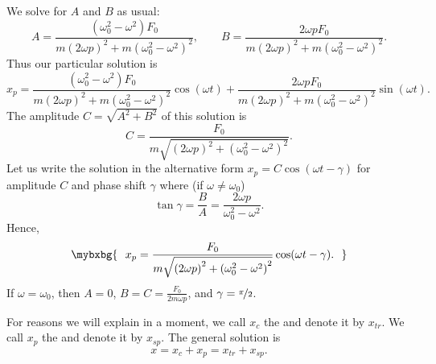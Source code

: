 We solve for $A$ and $B$ as usual:
\begin{equation*}
A=\frac{(\omega_0^2-\omega^2) F_0}
{m{(2\omega p)}^2+m{(\omega_0^2-\omega^2)}^2} ,
\qquad B=\frac{2 \omega p F_0}
{m{(2\omega p)}^2+m{(\omega_0^2-\omega^2)}^2} .
\end{equation*}
Thus our particular solution is
\begin{equation*}
x_p = 
\frac{(\omega_0^2-\omega^2) F_0}
{m{(2\omega p)}^2+m{(\omega_0^2-\omega^2)}^2} \cos (\omega t) +
\frac{2 \omega p F_0}
{m{(2\omega p)}^2+m{(\omega_0^2-\omega^2)}^2} \sin (\omega t) .
\end{equation*}
The amplitude $C = \sqrt{A^2+B^2}$ of this solution is
\begin{equation*}
C = \frac{F_0}{m \sqrt{{(2\omega p)}^2+{(\omega_0^2-\omega^2)}^2}} .
\end{equation*}
Let us write the solution
in the alternative form $x_p = C \cos(\omega t - \gamma)$
for amplitude $C$ and phase shift $\gamma$ where (if $\omega \not= \omega_0$)
\begin{equation*}
\tan \gamma = \frac{B}{A} = \frac{2\omega p}{\omega_0^2-\omega^2} .
\end{equation*}
Hence,
\begin{equation*}
\mybxbg{~~
x_p = 
\frac{F_0}{m \sqrt{{(2\omega p)}^2+{(\omega_0^2-\omega^2)}^2}} 
\cos ( \omega t - \gamma ) .
~~}
\end{equation*}
If $\omega = \omega_0$, then $A=0$, $B = C = \frac{F_0}{2m\omega p}$,
and $\gamma = \nicefrac{\pi}{2}$.



\medskip

For reasons we will explain in a moment, we call $x_c$ the
\emph{}
and denote it by $x_{tr}$.  We call
$x_p$ the \emph{} and denote it
by $x_{sp}$.
The general solution is
\begin{equation*}
x = x_c + x_p = x_{tr} + x_{sp} .
\end{equation*}

